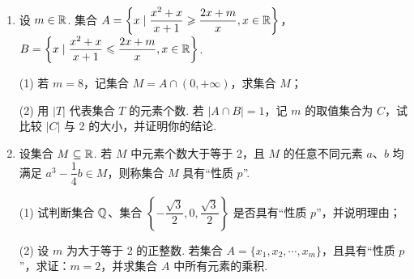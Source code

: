 \begin{enumerate}
\item 设 $m\in\mathbb{R}$. 集合 $A=\left\{x\mid\dfrac{x^2+x}{x+1}\geqslant\dfrac{2x+m}{x},x\in\mathbb{R}\right\}$，
$B=\left\{x\mid\dfrac{x^2+x}{x+1}\leqslant\dfrac{2x+m}{x},x\in\mathbb{R}\right\}$.

(1) 若 $m=8$，记集合 $M=A\cap(0,+\infty)$，求集合 $M$；

(2) 用 $\lvert T\rvert$ 代表集合 $T$ 的元素个数. 若 $\lvert A\cap B\rvert=1$，记 $m$ 的取值集合为 $C$，试比较 $\lvert C\rvert$ 与 2 的大小，并证明你的结论.

\ifanswer
\solbegin
{}
\step{$\Leftrightarrow(x-4)(x+2)\geqslant0\Leftrightarrow x\geqslant4$，所以 $M=[4,+\infty)$.}
\solend
\fi

\item 设集合 $M\subseteq\mathbb{R}$. 若 $M$ 中元素个数大于等于 2，且 $M$ 的任意不同元素 $a$、$b$ 均满足 $a^3-\dfrac14b\in M$，则称集合 $M$ 具有“性质 $p$”.

(1) 试判断集合 $\mathbb{Q}$、集合 $\left\{-\dfrac{\sqrt3}{2},0,\dfrac{\sqrt3}{2}\right\}$ 是否具有“性质 $p$”，并说明理由；

(2) 设 $m$ 为大于等于 2 的正整数. 若集合 $A=\{x_1,x_2,\cdots,x_m\}$，且具有“性质 $p$”，求证：$m=2$，并求集合 $A$ 中所有元素的乘积.


\end{enumerate}
